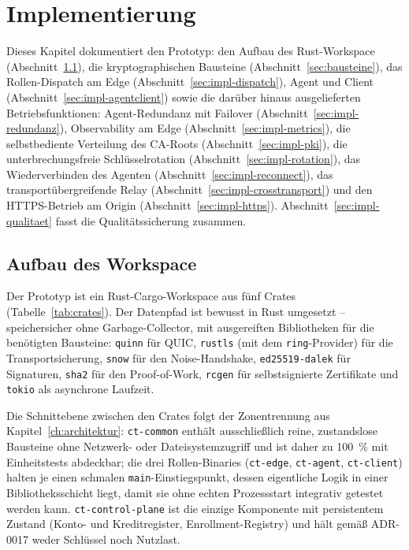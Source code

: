 \chapter{Implementierung}
\label{ch:implementierung}

Dieses Kapitel dokumentiert den Prototyp: den Aufbau des Rust-Workspace
(Abschnitt~\ref{sec:workspace}), die kryptographischen Bausteine
(Abschnitt~\ref{sec:bausteine}), das Rollen-Dispatch am Edge
(Abschnitt~\ref{sec:impl-dispatch}), Agent und Client
(Abschnitt~\ref{sec:impl-agentclient}) sowie die darüber hinaus ausgelieferten
Betriebsfunktionen: Agent-Redundanz mit Failover
(Abschnitt~\ref{sec:impl-redundanz}), Observability am Edge
(Abschnitt~\ref{sec:impl-metrics}), die selbstbediente Verteilung des CA-Roots
(Abschnitt~\ref{sec:impl-pki}), die unterbrechungsfreie Schlüsselrotation
(Abschnitt~\ref{sec:impl-rotation}), das Wiederverbinden des Agenten
(Abschnitt~\ref{sec:impl-reconnect}), das transportübergreifende Relay
(Abschnitt~\ref{sec:impl-crosstransport}) und den HTTPS-Betrieb am Origin
(Abschnitt~\ref{sec:impl-https}). Abschnitt~\ref{sec:impl-qualitaet} fasst die
Qualitätssicherung zusammen.

\section{Aufbau des Workspace}
\label{sec:workspace}

Der Prototyp ist ein Rust-Cargo-Workspace aus fünf Crates
(Tabelle~\ref{tab:crates}). Der Datenpfad ist bewusst in Rust umgesetzt --
speichersicher ohne Garbage-Collector, mit ausgereiften Bibliotheken für die
benötigten Bausteine: \texttt{quinn} für QUIC, \texttt{rustls} (mit dem
\texttt{ring}-Provider) für die Transportsicherung, \texttt{snow} für den
Noise-Handshake, \texttt{ed25519-dalek} für Signaturen, \texttt{sha2} für den
Proof-of-Work, \texttt{rcgen} für selbstsignierte Zertifikate und \texttt{tokio}
als asynchrone Laufzeit.

Die Schnittebene zwischen den Crates folgt der Zonentrennung aus
Kapitel~\ref{ch:architektur}: \texttt{ct-common} enthält ausschließlich reine,
zustandslose Bausteine ohne Netzwerk- oder Dateisystemzugriff und ist daher zu
100~\% mit Einheitstests abdeckbar; die drei Rollen-Binaries
(\texttt{ct-edge}, \texttt{ct-agent}, \texttt{ct-client}) halten je einen
schmalen \texttt{main}-Einstiegspunkt, dessen eigentliche Logik in einer
Bibliotheks\-schicht liegt, damit sie ohne echten Prozessstart integrativ
getestet werden kann. \texttt{ct-control-plane} ist die einzige Komponente mit
persistentem Zustand (Konto- und Kreditregister, Enrollment-Registry) und hält
gemäß ADR-0017 weder Schlüssel noch Nutzlast.

